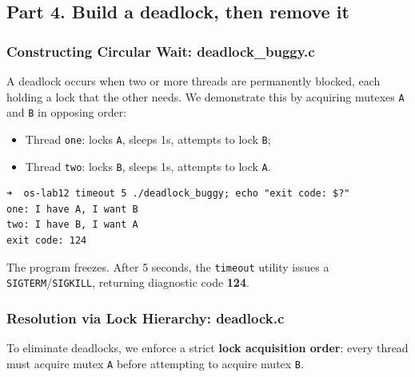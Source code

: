 \documentclass{labreport}
\begin{document}
\subsection{Part 4. Build a deadlock, then remove it}

\subsubsection{Constructing Circular Wait: deadlock\_buggy.c}
A deadlock occurs when two or more threads are permanently blocked, each holding a lock that the other needs. We demonstrate this by acquiring mutexes \texttt{A} and \texttt{B} in opposing order:
\begin{itemize}[noitemsep]
    \item Thread \texttt{one}: locks \texttt{A}, sleeps 1s, attempts to lock \texttt{B};
    \item Thread \texttt{two}: locks \texttt{B}, sleeps 1s, attempts to lock \texttt{A}.
\end{itemize}

\begin{lstlisting}[style=bash]
➜  os-lab12 timeout 5 ./deadlock_buggy; echo "exit code: $?"
one: I have A, I want B
two: I have B, I want A
exit code: 124
\end{lstlisting}

The program freezes. After 5 seconds, the \texttt{timeout} utility issues a \texttt{SIGTERM}/\texttt{SIGKILL}, returning diagnostic code \textbf{124}.

\subsubsection{Resolution via Lock Hierarchy: deadlock.c}
To eliminate deadlocks, we enforce a strict \textbf{lock acquisition order}: every thread must acquire mutex \texttt{A} before attempting to acquire mutex \texttt{B}.
\end{document}
